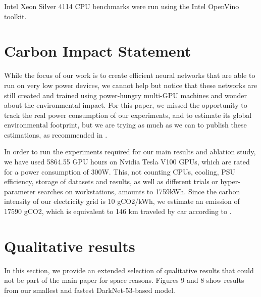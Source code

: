 \documentclass[10pt,twocolumn]{article}
\begin{document}
Intel Xeon Silver 4114 CPU benchmarks were run using
the Intel OpenVino toolkit.

\section{Carbon Impact Statement}

While the focus of our work is to create efficient neural
networks that are able to run on very low power devices, we
cannot help but notice that these networks are still created
and trained using power-hungry multi-GPU machines and
wonder about the environmental impact. For this paper, we
missed the opportunity to track the real power consumption
of our experiments, and to estimate its global environmental
footprint, but we are trying as much as we can to publish
these estimations, as recommended in \cite{anthony2020carbontracker,henderson2020towards,lannelongue2020green}.

In order to run the experiments required for our main results
and ablation study, we have used 5864.55 GPU hours
on Nvidia Tesla V100 GPUs, which are rated for a power
consumption of 300W. This, not counting CPUs, cooling,
PSU efficiency, storage of datasets and results, as well as
different trials or hyper-parameter searches on workstations,
amounts to 1759kWh. Since the carbon intensity of our
electricity grid is 10 gCO2/kWh, we estimate an emission
of 17590 gCO2, which is equivalent to 146 km traveled by
car according to \cite{anthony2020carbontracker}.

\section{Qualitative results}

In this section, we provide an extended selection of qualitative
results that could not be part of the main paper for
space reasons. Figures 9 and 8 show results from our smallest
and fastest DarkNet-53-based model.

\newpage

{\small


}
\end{document}

